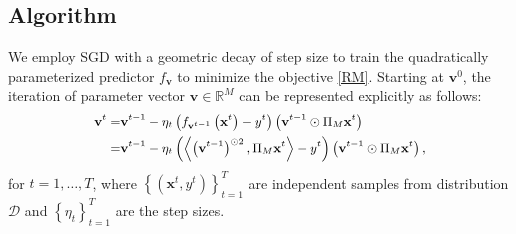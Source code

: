 \subsection{Algorithm}
We employ SGD with a geometric decay of step size to train the quadratically parameterized predictor $f_{\mathbf{v} }$ to minimize the objective \eqref{RM}. Starting at $\mathbf{v}^0$, the iteration of parameter vector $\mathbf{v}\in \mathbb{R}^M$ can be represented explicitly as follows:
\begin{equation}\nonumber
\small
\begin{aligned}
    \mathbf{v}^t= &\mathbf{v}^{t-1}-\eta _t\left ( f_{\mathbf{v}^{t-1}} \left ( \mathbf{x}^t \right )-y^t \right )\left (\mathbf{v}^{t-1}\odot \Pi_M\mathbf{x}^{t}    \right ) \\
=  &\mathbf{v}^{t-1}-\eta _t\left (\left \langle \left ( \mathbf{v}^{t-1} \right )^{\odot 2},\Pi_M\mathbf{x}^t     \right \rangle -y^t \right )\left(\mathbf{v}^{t-1}\odot \Pi_M\mathbf{x}^{t}\right ),
\end{aligned}
\end{equation}
for $t=1,\dots,T$, where $\left\{\left ( \mathbf{x}^t,y^t\right)\right \}_{t=1}^{T}$ are independent samples from distribution $\mathcal{D}$ and $\left\{ \eta_t\right\}_{t=1}^{T}$ are the step sizes.

